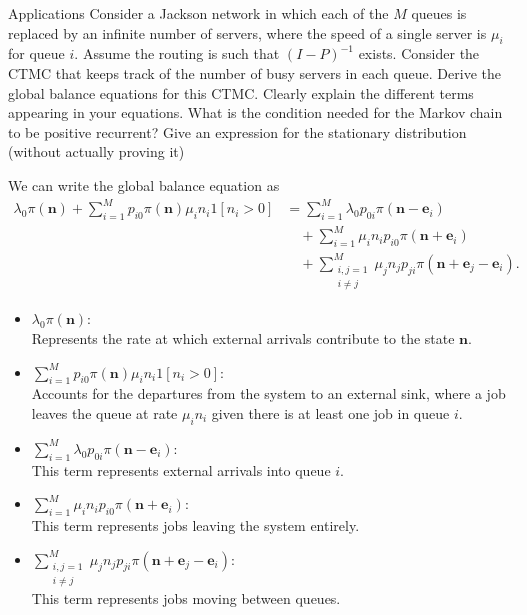 \begin{problem}{Applications}
  Consider a Jackson network in which each of the $M$ queues is replaced by an infinite number of servers, where the speed of a single server is $\mu_i$ for queue $i$. Assume the routing is such that $(I - P )^{-1}$ exists. Consider the CTMC that keeps track of the number of busy servers in each queue. Derive the global balance equations for this CTMC. Clearly explain the different terms appearing in your equations. What is the condition needed for the Markov chain to be positive recurrent? Give an expression for the stationary distribution (without actually proving it)
\end{problem}
\begin{solution}
    We can write the global balance equation as
    \begin{align*}
    \lambda_0 \pi(\mathbf{n})
    + \sum_{i=1}^M p_{i0} \pi(\mathbf{n}) \mu_i n_i 1[n_i > 0]
    &= \sum_{i=1}^M \lambda_0 p_{0i} \pi(\mathbf{n} - \mathbf{e}_i) \\
    &\quad + \sum_{i=1}^M \mu_i n_i p_{i0} \pi(\mathbf{n} + \mathbf{e}_i) \\
    &\quad + \sum_{\substack{i,j=1 \\ i \neq j}}^M \mu_j n_j p_{ji} \pi(\mathbf{n} + \mathbf{e}_j - \mathbf{e}_i).
    \end{align*}

    \begin{itemize}
        \item $\lambda_0 \pi(\mathbf{n})$: \\
            Represents the rate at which external arrivals contribute to the state $\mathbf{n}$.
        \item $\sum_{i=1}^M p_{i0} \pi(\mathbf{n}) \mu_i n_i 1[n_i > 0]$: \\
            Accounts for the departures from the system to an external sink, where a job leaves the queue at rate $\mu_in_i$ given there is at least one job in queue $i$.
        \item $\sum_{i=1}^M \lambda_0 p_{0i} \pi(\mathbf{n} - \mathbf{e}_i)$: \\
            This term represents external arrivals into queue $i$.
        \item $\sum_{i=1}^M \mu_i n_i p_{i0} \pi(\mathbf{n} + \mathbf{e}_i)$: \\
            This term represents jobs leaving the system entirely.
        \item $\sum_{\substack{i,j=1 \\ i \neq j}}^M \mu_j n_j p_{ji} \pi(\mathbf{n} + \mathbf{e}_j - \mathbf{e}_i)$: \\
            This term represents jobs moving between queues.
    \end{itemize}


\end{solution}
